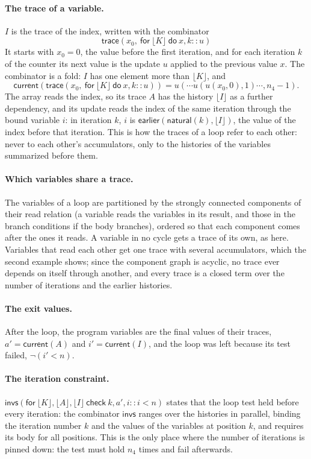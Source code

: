 \documentclass[11pt,a4paper]{article}
\newcommand{\bl}[1]{\lfloor #1\rfloor}                       %
\newcommand{\tr}[3]{\mathsf{trace}(#1,\ \mathsf{for}\ #2\ \mathsf{do}\ #3)}
\newcommand{\al}[2]{\mathsf{invs}(\mathsf{for}\ #1\ \mathsf{check}\ #2)}
\newcommand{\cur}{\mathsf{current}}
\newcommand{\ear}{\mathsf{earlier}}
\newcommand{\natf}{\mathsf{natural}}
\begin{document}
\paragraph{The trace of a variable.} $I$ is the trace of the index, written with the combinator
\[
\tr{x_0}{\bl{K}}{x, k :: u}
\]
It starts with $x_0 = 0$, the value before the first iteration, and for each iteration $k$ of the counter its next
value is the update $u$ applied to the previous value $x$. The combinator is a fold: $I$ has one element more than
$\bl{K}$, and
\[
\cur(\tr{x_0}{\bl{K}}{x, k :: u}) = u(\cdots u(u(x_0, 0), 1) \cdots, n_4 - 1).
\]
The array reads the index, so its trace $A$ has the history $\bl{I}$ as a further dependency, and its update reads
the index of the same iteration through the bound variable $i$: in iteration $k$, $i$ is $\ear(\natf(k), \bl{I})$,
the value of the index before that iteration. This is how the traces of a loop refer to each other: never to each
other's accumulators, only to the histories of the variables summarized before them.

\paragraph{Which variables share a trace.} The variables of a loop are partitioned by the strongly connected
components of their read relation (a variable reads the variables in its result, and those in the branch
conditions if the body branches), ordered so that each component comes after the ones it reads. A variable in no
cycle gets a trace of its own, as here. Variables that read each other get one trace with several accumulators,
which the second example shows; since the component graph is acyclic, no trace ever depends on itself through
another, and every trace is a closed term over the number of iterations and the earlier histories.

\paragraph{The exit values.} After the loop, the program variables are the final values of their traces,
$a' = \cur(A)$ and $i' = \cur(I)$, and the loop was left because its test failed, $\neg(i' < n)$.

\paragraph{The iteration constraint.} $\al{\bl{K}, \bl{A}, \bl{I}}{k, a', i :: i < n}$ states that the loop test
held before every iteration: the combinator $\mathsf{invs}$ ranges over the histories in parallel, binding the
iteration number $k$ and the values of the variables at position $k$, and requires its body for all positions. This
is the only place where the number of iterations is pinned down: the test must hold $n_4$ times and fail afterwards.
\end{document}
